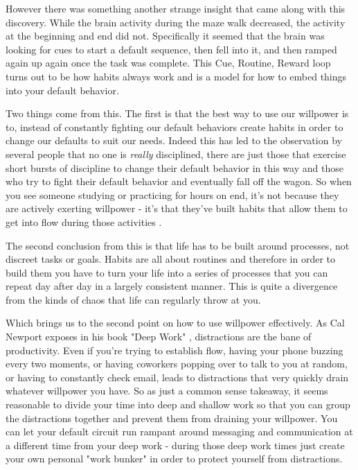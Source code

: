 \documentclass[11pt,a5paper]{book}
\begin{document}
However there was something another strange insight that came along with this discovery. While the brain activity during the maze walk decreased, the activity at the beginning and end did not. Specifically it seemed that the brain was looking for cues to start a default sequence, then fell into it, and then ramped again up again once the task was complete. This Cue, Routine, Reward loop turns out to be how habits always work \cite{duhigg} and is a model for how to embed things into your default behavior. 
\newline

Two things come from this. The first is that the best way to use our willpower is to, instead of constantly fighting our default behaviors  create habits in order to change our defaults to suit our needs. Indeed this has led to the observation by several people that no one is \textit{really} disciplined, there are just those that exercise short bursts of discipline to change their default behavior in this way and those who try to fight their default behavior and eventually fall off the wagon. So when you see someone studying or practicing for hours on end, it's not because they are actively exerting willpower - it's that they've built habits that allow them to get into flow during those activities \cite{keller}. 
\newline

The second conclusion from this is that life has to be built around processes, not discreet tasks or goals. Habits are all about routines and therefore in order to build them you have to turn your life into a series of processes that you can repeat day after day in a largely consistent manner. This is quite a divergence from the kinds of chaos that life can regularly throw at you.
\newline

Which brings us to the second point on how to use willpower effectively. As Cal Newport exposes in his book "Deep Work" \cite{newport}, distractions are the bane of productivity. Even if you're trying to establish flow, having your phone buzzing every two moments, or having coworkers popping over to talk to you at random, or having to constantly check email, leads to distractions that very quickly drain whatever willpower you have. So as just a common sense takeaway, it seems reasonable to divide your time into deep and shallow work so that you can group the distractions together and prevent them from draining your willpower. You can let your default circuit run rampant around messaging and communication at a different time from your deep work - during those deep work times just create your own personal "work bunker" \cite{newport} in order to protect yourself from distractions.
\newline
\end{document}
